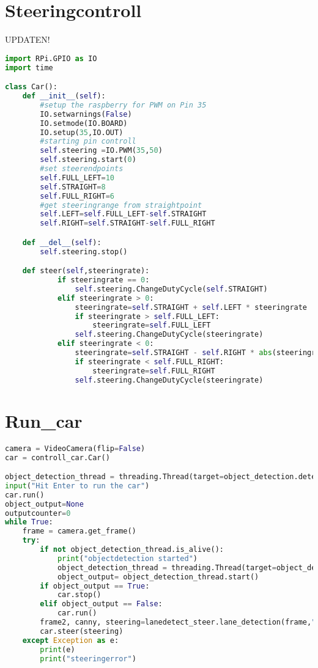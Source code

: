 \chapter{Steeringcontroll}\label{c:steeringcontroll}
UPDATEN!
\begin{lstlisting}[language=Python]
import RPi.GPIO as IO
import time

class Car():
    def __init__(self):
        #setup the raspberry for PWM on Pin 35
        IO.setwarnings(False)
        IO.setmode(IO.BOARD)
        IO.setup(35,IO.OUT)
        #starting pin controll
        self.steering =IO.PWM(35,50)
        self.steering.start(0)
        #set steerendpoints
        self.FULL_LEFT=10
        self.STRAIGHT=8
        self.FULL_RIGHT=6
        #get steeringrange from straightpoint
        self.LEFT=self.FULL_LEFT-self.STRAIGHT
        self.RIGHT=self.STRAIGHT-self.FULL_RIGHT

    def __del__(self):
        self.steering.stop()

    def steer(self,steeringrate):
            if steeringrate == 0:
                self.steering.ChangeDutyCycle(self.STRAIGHT)    
            elif steeringrate > 0:
                steeringrate=self.STRAIGHT + self.LEFT * steeringrate            
                if steeringrate > self.FULL_LEFT:
                    steeringrate=self.FULL_LEFT
                self.steering.ChangeDutyCycle(steeringrate)
            elif steeringrate < 0:
                steeringrate=self.STRAIGHT - self.RIGHT * abs(steeringrate)
                if steeringrate < self.FULL_RIGHT:
                    steeringrate=self.FULL_RIGHT
                self.steering.ChangeDutyCycle(steeringrate)
\end{lstlisting}

\chapter{Run\_car}\label{c:run_car}
\begin{lstlisting}[language=Python]
camera = VideoCamera(flip=False)
car = controll_car.Car()

object_detection_thread = threading.Thread(target=object_detection.detect_webcam_delay, args=(1,))
input("Hit Enter to run the car")
car.run()
object_output=None
outputcounter=0
while True:
    frame = camera.get_frame()
    try:
        if not object_detection_thread.is_alive():
            print("objectdetection started")
            object_detection_thread = threading.Thread(target=object_detection.detect_webcam_delay, args=(1,))
            object_output= object_detection_thread.start()
        if object_output == True:
            car.stop()
        elif object_output == False:
            car.run()
        frame2, canny, steering=lanedetect_steer.lane_detection(frame,"indoor")
        car.steer(steering)
    except Exception as e:
    	print(e)
        print("steeringerror")
\end{lstlisting}